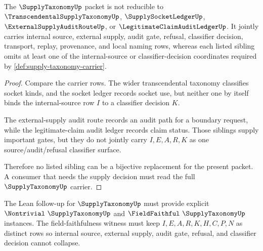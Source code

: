 \begin{theorem}
\label{thm:supply-taxonomy-sibling-separation}
The $\SupplyTaxonomyUp$ packet is not reducible to $\TranscendentalSupplyTaxonomyUp$, $\SupplySocketLedgerUp$, $\ExternalSupplyAuditRouteUp$, or $\LegitimateClaimAuditLedgerUp$. It jointly carries internal source, external supply, audit gate, refusal, classifier decision, transport, replay, provenance, and local naming rows, whereas each listed sibling omits at least one of the internal-source or classifier-decision coordinates required by \autoref{def:supply-taxonomy-carrier}.
\end{theorem}
\begin{proof}
Compare the carrier rows. The wider transcendental taxonomy classifies socket kinds, and the socket ledger records socket use, but neither one by itself binds the internal-source row $I$ to a classifier decision $K$.

The external-supply audit route records an audit path for a boundary request, while the legitimate-claim audit ledger records claim status. Those siblings supply important gates, but they do not jointly carry $I,E,A,R,K$ as one source/audit/refusal classifier surface.

Therefore no listed sibling can be a bijective replacement for the present packet. A consumer that needs the supply decision must read the full $\SupplyTaxonomyUp$ carrier.
\end{proof}

The Lean follow-up for $\SupplyTaxonomyUp$ must provide explicit $\Nontrivial\ \SupplyTaxonomyUp$ and $\FieldFaithful\ \SupplyTaxonomyUp$ instances. The field-faithfulness witness must keep $I,E,A,R,K,H,C,P,N$ as distinct rows so internal source, external supply, audit gate, refusal, and classifier decision cannot collapse.




